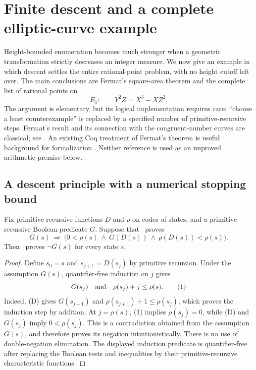 \section{Finite descent and a complete elliptic-curve example}
\label{sec:descent}

Height-bounded enumeration becomes much stronger when a geometric transformation
strictly decreases an integer measure.  We now give an example in which descent
settles the entire rational-point problem, with no height cutoff left over.  The
main conclusions are Fermat's square-area theorem and the complete list of
rational points on
\[
  E_1:\qquad Y^2Z=X^3-XZ^2.
\]
The argument is elementary, but its logical implementation requires care:
``choose a least counterexample'' is replaced by a specified number of
primitive-recursive steps.  Fermat's result and its connection with the
congruent-number curves are classical; see \cite{ConradCongruent}.  An existing
Coq treatment of Fermat's theorem is useful background for formalization
\cite{DelahayeMayero}.  Neither reference is used as an unproved arithmetic
premise below.

\subsection{A descent principle with a numerical stopping bound}

\begin{lemma}\label{lem:finite-descent}
Fix primitive-recursive functions $D$ and $\rho$ on codes of states, and a
primitive-recursive Boolean predicate $G$.  Suppose that \iPRA\ proves
\[
 G(s)\ \Longrightarrow\
  \bigl(0<\rho(s)\ \wedge\ G(D(s))\ \wedge\ \rho(D(s))<\rho(s)\bigr).
 \tag{D}
\]
Then \iPRA\ proves $\neg G(s)$ for every state $s$.
\end{lemma}

\begin{proof}
Define $s_0=s$ and $s_{j+1}=D(s_j)$ by primitive recursion.  Under the
assumption $G(s)$, quantifier-free induction on $j$ gives
\[
 G(s_j)\quad\hbox{and}\quad \rho(s_j)+j\leq\rho(s).
 \tag{1}
\]
Indeed, (D) gives $G(s_{j+1})$ and
$\rho(s_{j+1})+1\leq\rho(s_j)$, which proves the induction step by addition.
At $j=\rho(s)$, (1) implies $\rho(s_j)=0$, while (D) and $G(s_j)$ imply
$0<\rho(s_j)$.  This is a contradiction obtained from the assumption $G(s)$,
and therefore proves its negation intuitionistically.  There is no use of
double-negation elimination.  The displayed induction predicate is
quantifier-free after replacing the Boolean tests and inequalities by their
primitive-recursive characteristic functions.
\end{proof}

